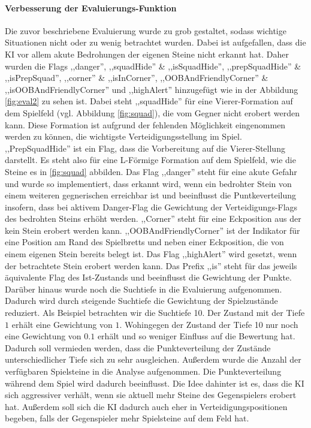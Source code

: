 \paragraph{Verbesserung der Evaluierungs-Funktion}
Die zuvor beschriebene Evaluierung wurde zu grob gestaltet, sodass wichtige Situationen nicht oder zu wenig betrachtet wurden. Dabei ist aufgefallen, dass die KI vor allem akute Bedrohungen der eigenen Steine nicht erkannt hat. Daher wurden die Flags ,,danger'', ,,squadHide'' \& ,,isSquadHide'', ,,prepSquadHide'' \& ,,isPrepSquad'', ,,corner'' \& ,,isInCorner'', ,,OOBAndFriendlyCorner'' \& ,,isOOBAndFriendlyCorner'' und ,,highAlert'' hinzugefügt wie in der Abbildung \ref{fig:eval2} zu sehen ist. Dabei steht ,,squadHide'' für eine Vierer-Formation auf dem Spielfeld (vgl. Abbildung \ref{fig:squad}), die vom Gegner nicht erobert werden kann. Diese Formation ist aufgrund der fehlenden Möglichkeit eingenommen werden zu können, die wichtigste Verteidigungsstellung im Spiel. ,,PrepSquadHide'' ist ein Flag, dass die Vorbereitung auf die Vierer-Stellung darstellt. Es steht also für eine L-Förmige Formation auf dem Spielfeld, wie die Steine es in \ref{fig:squad} abbilden. Das Flag ,,danger'' steht für eine akute Gefahr und wurde so implementiert, dass erkannt wird, wenn ein bedrohter Stein von einem weiteren gegnerischen erreichbar ist und beeinflusst die Puntkeverteilung insofern, dass bei aktivem Danger-Flag die Gewichtung der Verteidigungs-Flags des bedrohten Steins erhöht werden. ,,Corner'' steht für eine Eckposition aus der kein Stein erobert werden kann. ,,OOBAndFriendlyCorner'' ist der Indikator für eine Position am Rand des Spielbretts und neben einer Eckposition, die von einem eigenen Stein bereits belegt ist. Das Flag ,,highAlert'' wird gesetzt, wenn der betrachtete Stein erobert werden kann. Das Prefix ,,is'' steht für das jeweils äquivalente Flag des Ist-Zustands und beeinflusst die Gewichtung der Punkte. \\Darüber hinaus wurde noch die Suchtiefe in die Evaluierung aufgenommen. Dadurch wird durch steigende Suchtiefe die Gewichtung der Spielzustände reduziert. Als Beispiel betrachten wir die Suchtiefe 10. Der Zustand mit der Tiefe $1$ erhält eine Gewichtung von $1$. Wohingegen der Zustand der Tiefe 10 nur noch eine Gewichtung von $0.1$ erhält und so weniger Einfluss auf die Bewertung hat. Dadurch soll vermieden werden, dass die Punkteverteilung der Zustände unterschiedlicher Tiefe sich zu sehr ausgleichen. Außerdem wurde die Anzahl der verfügbaren Spielsteine in die Analyse aufgenommen. Die Punkteverteilung während dem Spiel wird dadurch beeinflusst. Die Idee dahinter ist es, dass die KI sich aggressiver verhält, wenn sie aktuell mehr Steine des Gegenspielers erobert hat. Außerdem soll sich die KI dadurch auch eher in Verteidigungspositionen begeben, falls der Gegenspieler mehr Spielsteine auf dem Feld hat.
